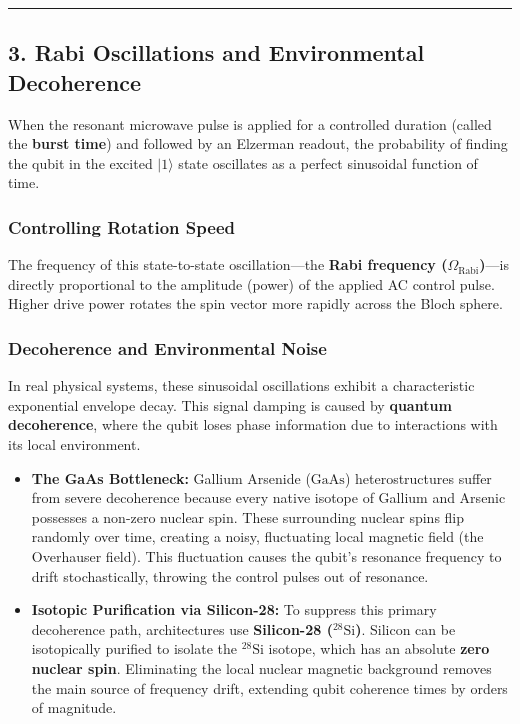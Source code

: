 \documentclass[
]{article}
\providecommand{\tightlist}{%
  \setlength{\itemsep}{0pt}\setlength{\parskip}{0pt}}
\begin{document}
\begin{center}\rule{0.5\linewidth}{0.5pt}\end{center}

\subsection{3. Rabi Oscillations and Environmental
Decoherence}\label{rabi-oscillations-and-environmental-decoherence}

When the resonant microwave pulse is applied for a controlled duration
(called the \textbf{burst time}) and followed by an Elzerman readout,
the probability of finding the qubit in the excited \(|1\rangle\) state
oscillates as a perfect sinusoidal function of time.

\subsubsection{Controlling Rotation
Speed}\label{controlling-rotation-speed}

The frequency of this state-to-state oscillation---the \textbf{Rabi
frequency (\(\Omega_{\text{Rabi}}\))}---is directly proportional to the
amplitude (power) of the applied AC control pulse. Higher drive power
rotates the spin vector more rapidly across the Bloch sphere.

\subsubsection{Decoherence and Environmental
Noise}\label{decoherence-and-environmental-noise}

In real physical systems, these sinusoidal oscillations exhibit a
characteristic exponential envelope decay. This signal damping is caused
by \textbf{quantum decoherence}, where the qubit loses phase information
due to interactions with its local environment.

\begin{itemize}
\tightlist
\item
  \textbf{The GaAs Bottleneck:} Gallium Arsenide (\(\text{GaAs}\))
  heterostructures suffer from severe decoherence because every native
  isotope of Gallium and Arsenic possesses a non-zero nuclear spin.
  These surrounding nuclear spins flip randomly over time, creating a
  noisy, fluctuating local magnetic field (the Overhauser field). This
  fluctuation causes the qubit's resonance frequency to drift
  stochastically, throwing the control pulses out of resonance.
\item
  \textbf{Isotopic Purification via Silicon-28:} To suppress this
  primary decoherence path, architectures use \textbf{Silicon-28
  (\(\text{}^{28}\text{Si}\))}. Silicon can be isotopically purified to
  isolate the \(\text{}^{28}\text{Si}\) isotope, which has an absolute
  \textbf{zero nuclear spin}. Eliminating the local nuclear magnetic
  background removes the main source of frequency drift, extending qubit
  coherence times by orders of magnitude.
\end{itemize}
\end{document}
